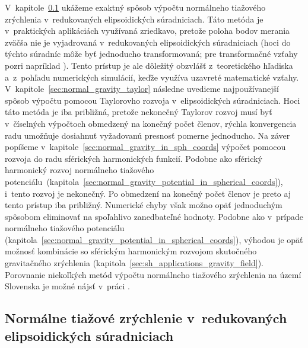 \documentclass[a4paper, 12pt]{book}
\begin{document}
V~kapitole~\ref{sec:normal_gravity_in_reduced_ell_coords} ukážeme exaktný 
spôsob výpočtu normálneho tiažového zrýchlenia v~redukovaných elipsoidických 
súradniciach.  Táto metóda je v~praktických aplikáciách využívaná zriedkavo, 
pretože poloha bodov merania zväčša nie je vyjadrovaná v~redukovaných 
elipsoidických súradniciach (hoci do týchto súradníc môže byť jednoducho 
transformovaná; pre transformačné vzťahy pozri napríklad 
\cite{MoritzPhysicalGeodesy}).  Tento prístup je ale dôležitý obzvlášť 
z~teoretického hľadiska a~z~pohľadu numerických simulácií, keďže využíva 
uzavreté matematické vzťahy.  V~kapitole~\ref{sec:normal_gravity_taylor} 
následne uvedieme najpoužívanejší spôsob výpočtu pomocou Taylorovho rozvoja 
v~elipsoidických súradniciach.  Hoci táto metóda je iba približná, pretože 
nekonečný Taylorov rozvoj musí byť v~číselných výpočtoch obmedzený na konečný 
počet členov, rýchla konvergencia radu umožňuje dosiahnuť vyžadovanú presnosť 
pomerne jednoducho.  Na záver popíšeme 
v~kapitole~\ref{sec:normal_gravity_in_sph_coords} výpočet pomocou rozvoja do 
radu sférických harmonických funkcií.  Podobne ako sférický harmonický rozvoj 
normálneho tiažového 
potenciálu~(kapitola~\ref{sec:normal_gravity_potential_in_spherical_coords}), 
i~tento rozvoj je nekonečný.  Po obmedzení na konečný počet členov je preto aj
tento prístup iba približný.  Numerické chyby však možno opäť jednoduchým 
spôsobom eliminovať na spoľahlivo zanedbateľné hodnoty.  Podobne ako v~prípade 
normálneho tiažového potenciálu 
(kapitola~\ref{sec:normal_gravity_potential_in_spherical_coords}), výhodou je 
opäť možnosť kombinácie so sférickým harmonickým rozvojom skutočného 
gravitačného zrýchlenia (kapitola~\ref{sec:sh_applications_gravity_field}).  
Porovnanie niekoľkých metód výpočtu normálneho tiažového zrýchlenia na území 
Slovenska je možné nájsť v~práci \textcite{Vajda2005}.



\subsection{Normálne tiažové zrýchlenie v~redukovaných elipsoidických 
súradniciach}
\label{sec:normal_gravity_in_reduced_ell_coords}
\end{document}
